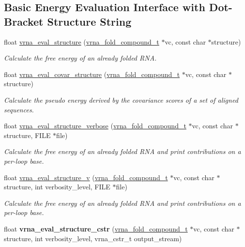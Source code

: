 \subsection*{Basic Energy Evaluation Interface with Dot-\/\+Bracket Structure String}
\begin{DoxyCompactItemize}
\item 
float \mbox{\hyperlink{group__eval_ga58f199f1438d794a265f3b27fc8ea631}{vrna\+\_\+eval\+\_\+structure}} (\mbox{\hyperlink{group__fold__compound_ga1b0cef17fd40466cef5968eaeeff6166}{vrna\+\_\+fold\+\_\+compound\+\_\+t}} $\ast$vc, const char $\ast$structure)
\begin{DoxyCompactList}\small\item\em Calculate the free energy of an already folded R\+NA. \end{DoxyCompactList}\item 
float \mbox{\hyperlink{group__eval_ga6cea75c0eb9857fb59172be54cab09e0}{vrna\+\_\+eval\+\_\+covar\+\_\+structure}} (\mbox{\hyperlink{group__fold__compound_ga1b0cef17fd40466cef5968eaeeff6166}{vrna\+\_\+fold\+\_\+compound\+\_\+t}} $\ast$vc, const char $\ast$structure)
\begin{DoxyCompactList}\small\item\em Calculate the pseudo energy derived by the covariance scores of a set of aligned sequences. \end{DoxyCompactList}\item 
float \mbox{\hyperlink{group__eval_ga0928d699d310178f84ee2351034e5cb5}{vrna\+\_\+eval\+\_\+structure\+\_\+verbose}} (\mbox{\hyperlink{group__fold__compound_ga1b0cef17fd40466cef5968eaeeff6166}{vrna\+\_\+fold\+\_\+compound\+\_\+t}} $\ast$vc, const char $\ast$structure, F\+I\+LE $\ast$file)
\begin{DoxyCompactList}\small\item\em Calculate the free energy of an already folded R\+NA and print contributions on a per-\/loop base. \end{DoxyCompactList}\item 
float \mbox{\hyperlink{group__eval_gab12e6b1226227670322150df018734f8}{vrna\+\_\+eval\+\_\+structure\+\_\+v}} (\mbox{\hyperlink{group__fold__compound_ga1b0cef17fd40466cef5968eaeeff6166}{vrna\+\_\+fold\+\_\+compound\+\_\+t}} $\ast$vc, const char $\ast$structure, int verbosity\+\_\+level, F\+I\+LE $\ast$file)
\begin{DoxyCompactList}\small\item\em Calculate the free energy of an already folded R\+NA and print contributions on a per-\/loop base. \end{DoxyCompactList}\item 
\mbox{\label{group__eval_ga1d49318a535422b723e2c47520ac090a}} 
float {\bfseries vrna\+\_\+eval\+\_\+structure\+\_\+cstr} (\mbox{\hyperlink{group__fold__compound_ga1b0cef17fd40466cef5968eaeeff6166}{vrna\+\_\+fold\+\_\+compound\+\_\+t}} $\ast$vc, const char $\ast$structure, int verbosity\+\_\+level, vrna\+\_\+cstr\+\_\+t output\+\_\+stream)
\end{DoxyCompactItemize}
